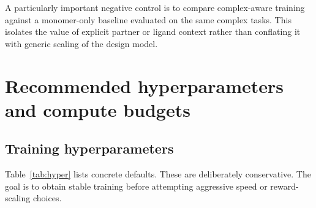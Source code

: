 \documentclass[11pt]{article}
\begin{document}
A particularly important negative control is to compare complex-aware training against a monomer-only baseline evaluated on the same complex tasks. This isolates the value of explicit partner or ligand context rather than conflating it with generic scaling of the design model.


\section{Recommended hyperparameters and compute budgets}
\label{sec:hyper}

\subsection{Training hyperparameters}

Table~\ref{tab:hyper} lists concrete defaults. These are deliberately conservative. The goal is to obtain stable training before attempting aggressive speed or reward-scaling choices.
\end{document}
